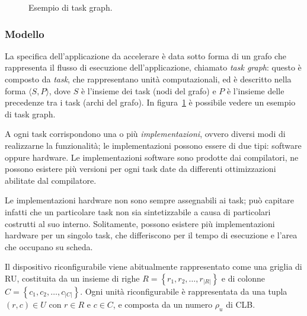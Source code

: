\begin{figure}[ht]
\begin{center}
\caption{Esempio di task graph.}
\label{fig:taskGraphExample}
\end{center}
\end{figure}

\subsubsection{Modello}

La specifica dell'applicazione da accelerare è data sotto forma di un grafo che
rappresenta il flusso di esecuzione dell'applicazione, chiamato \emph{task
graph}: questo è composto da \emph{task},
che rappresentano unità computazionali, ed \`e descritto nella forma
$\langle S, P \rangle$, dove $S$ è l'insieme dei task (nodi del grafo) e $P$
\`e l'insieme delle precedenze tra i task (archi del grafo).
In figura~\ref{fig:taskGraphExample} è possibile vedere un esempio di
task graph.

A ogni task corrispondono una o più \emph{implementazioni}, ovvero diversi modi di
realizzarne la funzionalità; le implementazioni possono essere di due tipi: software
oppure hardware. Le implementazioni software sono prodotte dai compilatori, ne possono
esistere più versioni per ogni task date da differenti ottimizzazioni abilitate dal
compilatore.

Le implementazioni hardware non sono sempre assegnabili ai task; può capitare infatti
che un particolare task non sia sintetizzabile a causa di particolari costrutti al suo interno.
Solitamente, possono esistere più implementazioni hardware per un singolo task,
che differiscono per il tempo di esecuzione e l'area che occupano su scheda.

Il dispositivo riconfigurabile viene abitualmente rappresentato come una griglia di \ac{RU}, 
costituita da un insieme di righe $R=\left\{r_1, r_2, \dots, r_{\vert R \vert}\right\}$ e 
di colonne $C=\left\{c_1, c_2, \dots, c_{\vert C \vert}\right\}$. Ogni unità 
riconfigurabile è rappresentata da una tupla $(r,c) \in U$ con $r \in R$ e $c \in C$, e 
composta da un numero $\rho_{u}$ di \ac{CLB}.

